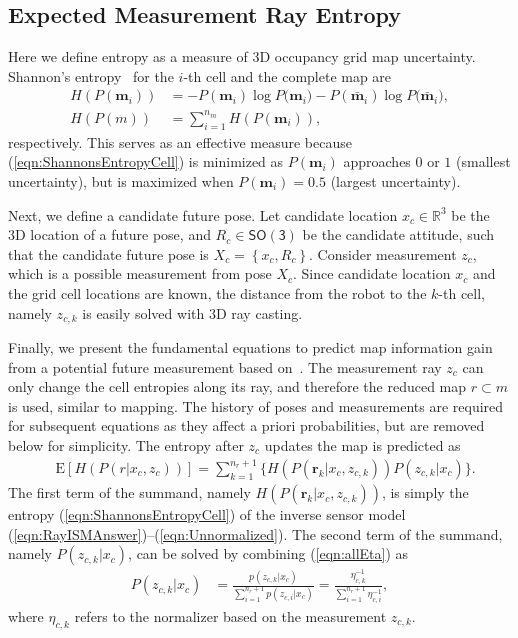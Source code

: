 \documentclass[conf]{new-aiaa}
\newcommand{\braces}[1]{\ensuremath{\left\{ #1 \right\}}}
\newcommand{\refeqn}[1]{(\ref{eqn:#1})}
\newcommand{\SO}{\ensuremath{\mathsf{SO(3)}}}
\renewcommand{\Re}{\ensuremath{\mathbb{R}}}
\begin{document}
\subsection{Expected Measurement Ray Entropy}

Here we define entropy as a measure of 3D occupancy grid map uncertainty. Shannon's entropy~\cite{StaGriBur05} for the $i$-th cell and the complete map are
\begin{align}
\label{eqn:ShannonsEntropyCell}
H(P(\mathbf{m}_i))&=-P(\mathbf{m}_i)\log{P(\mathbf{m}_i})-P(\bar{\mathbf{m}}_i)\log{P(\bar{\mathbf{m}}_i}),
\\
\label{eqn:ShannonsEntropyMap}
H(P(m))&=\sum_{i=1}^{n_m}H(P(\mathbf{m}_i)),
\end{align}
respectively. This serves as an effective measure because \refeqn{ShannonsEntropyCell} is minimized as $P(\mathbf{m}_i)$ approaches $0$ or $1$ (smallest uncertainty), but is maximized when $P(\mathbf{m}_i)=0.5$ (largest uncertainty).

Next, we define a candidate future pose. Let candidate location $x_c\in\Re^3$ be the 3D location of a future pose, and $R_c\in\SO$ be the candidate attitude, such that the candidate future pose is $X_c=\braces{x_c,R_c}$. Consider measurement $z_c$, which is a possible measurement from pose $X_c$. Since candidate location $x_c$ and the grid cell locations are known, the distance from the robot to the $k$-th cell, namely $z_{c,k}$ is easily solved with 3D ray casting.

Finally, we present the fundamental equations to predict map information gain from a potential future measurement based on~\cite{KauAiLee16}. The measurement ray $z_c$ can only change the cell entropies along its ray, and therefore the reduced map $r\subset m$ is used, similar to mapping. The history of poses and measurements are required for subsequent equations as they affect a priori probabilities, but are removed below for simplicity. The entropy after $z_c$ updates the map is predicted as
\begin{align}
\label{eqn:DiscExpEntropyRay}
&\text{E}[H(P(r|x_c,z_{c}))]=\sum_{k=1}^{n_{r}+1}\bigg\{H(P(\mathbf{r}_k|x_c,z_{c,k}))P(z_{c,k}|x_c)\bigg\}.
\end{align}
The first term of the summand, namely $H(P(\mathbf{r}_k|x_c,z_{c,k}))$, is simply the entropy \refeqn{ShannonsEntropyCell} of the inverse sensor model \refeqn{RayISMAnswer}--\refeqn{Unnormalized}. The second term of the summand, namely $P(z_{c,k}|x_c)$, can be solved by combining \refeqn{allEta} as
\begin{align}
\label{eqn:ProbMeas}
P(z_{c,k}|x_c)&=\frac{p(z_{c,k}|x_c)}{\sum_{i=1}^{n_{r}+1}p(z_{c,i}|x_c)}=\frac{\eta_{c,k}^{-1}}{\sum_{i=1}^{n_{r}+1}\eta_{c,i}^{-1}},
\end{align}
where $\eta_{c,k}$ refers to the normalizer based on the measurement $z_{c,k}$.
\end{document}
